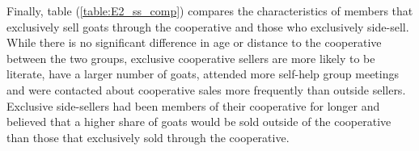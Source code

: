 \documentclass[11pt]{article}
\begin{document}
\singlespacing
\begin{table}[H]
  \centering
  \caption{Perception of Side-Selling}
  \label{table:E2_ss_perception}
\end{table}
\doublespacing

Finally, table (\ref{table:E2_ss_comp}) compares the characteristics of members that exclusively sell goats through the cooperative and those who exclusively side-sell. While there is no significant difference in age or distance to the cooperative between the two groups, exclusive cooperative sellers are more likely to be literate, have a larger number of goats, attended more self-help group meetings and were contacted about cooperative sales more frequently than outside sellers. Exclusive side-sellers had been members of their cooperative for longer and believed that a higher share of goats would be sold outside of the cooperative than those that exclusively sold through the cooperative. 
\end{document}
